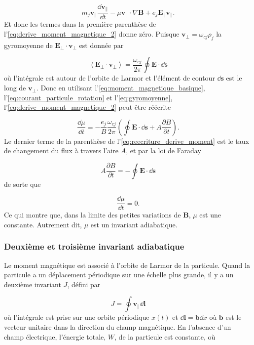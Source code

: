 \documentclass[main.tex]{subfiles}
\begin{document}
\[
	m_j \bm{v_\parallel} \frac{\dd \bm{v_\parallel}}{\dd t} - \mu \bm{v_\parallel} \cdot \nabla \bm{B} +  e_j \bm{E_\parallel} \bm{v_\parallel}.
\]
Et donc les termes dans la première parenthèse de l'\autoref{eq:derive_moment_magnetique_2} donne zéro.
Puisque \( \bm{v_\perp} = \omega_{cj} \rho_j \) la gyromoyenne de \( \bm{E_\perp} \cdot \bm{v_\perp} \) est donnée par

\begin{equation}
	\left\langle \bm{E_\perp} \cdot \bm{v_\perp} \right\rangle = \frac{\omega_{cj}}{2 \pi} \oint \bm{E} \cdot \bm{\dd s}
	\label{eq:gyromoyenne}
\end{equation}
où l'intégrale est  autour de l'orbite de Larmor et l'élément de contour \( \bm{\dd s} \) est le long de \( \bm{v_\perp} \).
Donc en utilisant l'\autoref{eq:moment_magnetique_basique}, l'\autoref{eq:courant_particule_rotation} et l'\autoref{eq:gyromoyenne}, l'\autoref{eq:derive_moment_magnetique_2} peut être réécrite

\begin{equation}
	\frac{\dd \mu}{\dd t} = - \frac{e_j}{B} \frac{\omega_{cj}}{2\pi} \left( \oint \bm{E} \cdot \bm{\dd s} + A \frac{\partial B}{\partial t} \right).
	\label{eq:reecriture_derive_moment}
\end{equation}
Le dernier terme de la parenthèse de l'\autoref{eq:reecriture_derive_moment} est le taux de changement du flux à travers l'aire \( A \), et par la loi de Faraday

\[
	A \frac{\partial B}{\partial t} = - \oint \bm{E} \cdot \bm{\dd s}
\]
de sorte que 

\[
	\frac{\dd \mu}{\dd t} = 0.
\]
Ce qui montre que, dans la limite des petites variations de \(  \bm{B} \), \( \mu \) est une constante.
Autrement dit, \( \mu \) est un invariant adiabatique.

\subsubsection*{Deuxième et troisième invariant adiabatique}

Le moment magnétique est associé à l'orbite de Larmor de la particule.
Quand la particule a un déplacement périodique sur une échelle plus grande, il y a un deuxième invariant \( J \), défini par

\begin{equation}
	J = \oint \bm{v_\parallel} \bm{\dd l}
	\label{eq:def_J}
\end{equation}
où l'intégrale est prise sur une orbite périodique \( x(t) \) et \( \bm{\dd l} = \bm{b} \dd x \) où \( \bm{b} \) est le vecteur unitaire dans la direction du champ magnétique.
En l'absence d'un champ électrique, l'énergie totale, \( W \), de la particule est constante, où
\end{document}
